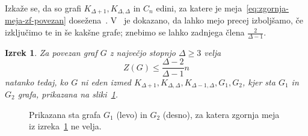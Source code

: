 \documentclass[12pt,a4paper,twoside]{article}
\theoremstyle{definition} %
\theoremstyle{plain} %
\newtheorem{izrek}[definicija]{Izrek}
\numberwithin{equation}{section}  %
\begin{document}
Izkaže se, da so grafi $K_{\Delta + 1}, K_{\Delta, \Delta}$ in $C_n$ edini, za katere je meja~\eqref{eq:zgornja-meja-zf-povezan} dosežena~\cite{lu2016proof, gentner2016extremal}. V~\cite{gentner2018bounds} je dokazano, da lahko mejo precej izboljšamo, če izključimo te in še kakšne grafe; znebimo se lahko zadnjega člena $\frac{2}{\Delta - 1}$.
\begin{izrek}{{\cite[izrek 4]{gentner2018bounds}}}
    \label{izr:zgornja-meja-gentner}
    Za povezan graf $G$ z največjo stopnjo $\Delta \geq 3$ velja
    \[ Z(G) \leq \frac{\Delta-2}{\Delta-1} n \]
    natanko tedaj, ko $G$ ni eden izmed $K_{\Delta + 1}, K_{\Delta, \Delta}, K_{\Delta-1, \Delta}, G_1, G_2$, kjer sta $G_1$ in $G_2$ grafa, prikazana na sliki~\ref{fig:g1g2}.
\end{izrek}
\begin{figure}[h]
    \centering
    \begin{subfigure}{0.49\textwidth}
        \centering
    \end{subfigure}
    \begin{subfigure}{0.5\textwidth}
        \centering
    \end{subfigure}
    \caption{Prikazana sta grafa $G_1$ (levo) in $G_2$ (desno), za katera zgornja meja iz izreka~\ref{izr:zgornja-meja-gentner} ne velja.}
    \label{fig:g1g2}
\end{figure}
\end{document}
